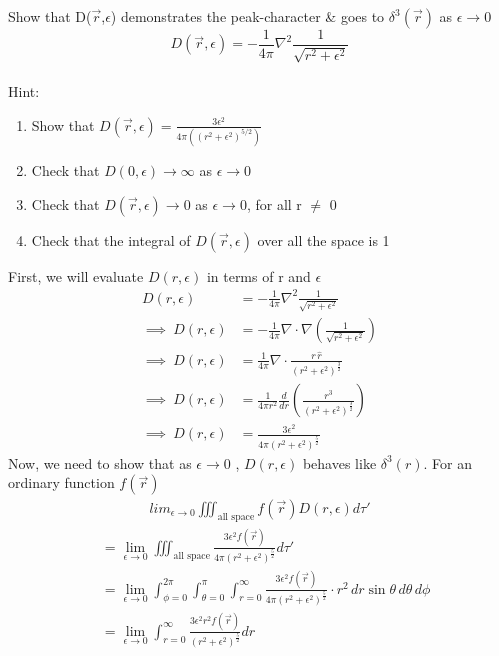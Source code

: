\documentclass[../main.tex]{subfiles}
\begin{document}
\begin{questions}
\question Show that D($\vec{r}$,$\epsilon$) demonstrates the peak-character \& goes to $\delta^{3}(\vec{r})$ as $\epsilon \to 0$ $$D(\vec{r},\epsilon)=-\frac{1}{4\pi}\nabla^2\frac{1}{\sqrt{r^2+\epsilon^2}}$$ \\
Hint:
\begin{enumerate}[label=(\roman*)]
	\item Show that $D(\vec{r},\epsilon)=\frac{3\epsilon^2}{4\pi (({r^2+\epsilon^2})^{5/2})}$
	\item Check that $D(0,\epsilon)\rightarrow \infty$ as $\epsilon \rightarrow 0$
	\item Check that $D(\vec{r},\epsilon)\rightarrow 0$ as $\epsilon \rightarrow 0$, for all r $\neq$ 0
	\item Check that the integral of $D(\vec{r},\epsilon)$ over all the space is 1
\end{enumerate}
\begin{solution}
	First, we will evaluate $D(r,\epsilon)$ in terms of r and $\epsilon$
	\begin{align}
		D(r,\epsilon)&=-\frac{1}{4\pi}\nabla^2\frac{1}{\sqrt{r^2+\epsilon^2}}
	\\
		\implies\ D(r,\epsilon)&=-\frac{1}{4\pi}\nabla\cdot\nabla\left(\frac{1}{\sqrt{r^2+\epsilon^2}}\right)
	\\
		\implies\ D(r,\epsilon)&=\frac{1}{4\pi}\nabla\cdot\frac{r\,\hat{r}}{(r^2+\epsilon^2)^{\frac{3}{2}}}
	\\
		\implies\ D(r,\epsilon)&=\frac{1}{4\pi r^2}\frac{d}{dr}\left(\frac{r^3}{(r^2+\epsilon^2)^{\frac{3}{2}}}\right)
	\\
		\implies\ D(r,\epsilon)&=\frac{3\epsilon^2}{4\pi(r^2+\epsilon^2)^{\frac{5}{2}}}
	\end{align}
	Now, we need to show that as $\epsilon\to0$ , $D(r,\epsilon)$ behaves like $\delta^3(r)$. For an ordinary function $f(\vec{r})$
	\begin{align}
		lim_{\epsilon \to 0} \iiint_{\text{all space}}f(\vec{r})D(r,\epsilon)d\tau'
	\end{align}
	\begin{align}
		&=\lim_{\epsilon \to 0} \iiint_{\text{all space}}\frac{3\epsilon^2f(\vec{r})}{4\pi(r^2+\epsilon^2)^{\frac{5}{2}}}d\tau'
	\\
		&=\lim_{\epsilon \to 0} \int_{\phi=0}^{2\pi}\int_{\theta=0}^{\pi}\int_{r=0}^{\infty}\frac{3\epsilon^2f(\vec{r})}{4\pi(r^2+\epsilon^2)^{\frac{5}{2}}} \cdot r^2 \,dr \sin\theta\,d\theta \,d\phi
	\\
		&=\lim_{\epsilon \to 0} \int_{r=0}^{\infty}\frac{3\epsilon^2r^2f(\vec{r})}{(r^2+\epsilon^2)^{\frac{5}{2}}} dr

\end{align}
\end{solution}
\end{questions}
\end{document}
